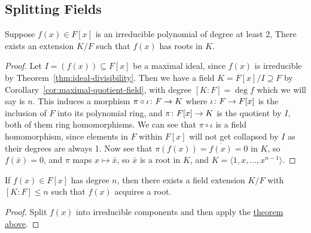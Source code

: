 
\subsection{Splitting Fields}

\begin{theorem}\label{thm:field-extension-gain-root}
    Suppose \(f(x) \in F[x]\) is an irreducible polynomial of degree at least 2,
    There exists an extension \(K/F\) such that \(f(x)\) has roots in \(K\).
\end{theorem}
\begin{proof}
    Let \(I = (f(x)) \subseteq F[x]\) be a maximal ideal,
    since \(f(x)\) is irreducible by Theorem~\ref{thm:ideal-divisibility}.
    Then we have a field \(K = F[x]/I \supseteq F\)
    by Corollary~\ref{cor:maximal-quotient-field},
    with degree \([K:F] = \deg f\) which we will say is \(n\).
    This induces a morphism \(\pi\circ\iota\colon F\to K\)
    where \(\iota\colon F\to F[x]\) is the inclusion of \(F\) into its polynomial ring,
    and \(\pi\colon F[x]\to K\) is the quotient by \(I\),
    both of them ring homomorphisms.
    We can see that \(\pi\circ\iota\) is a field homomorphism,
    since elements in \(F\) within \(F[x]\) will not get collapsed by \(I\)
    as their degrees are always 1.
    Now see that \(\pi(f(x)) = \overline{f(x)} = 0\) in \(K\),
    so \(f(\bar{x}) = 0\), and \(\pi\) maps \(x \mapsto \bar{x}\),
    so \(\bar{x}\) is a root in \(K\),
    and \(K = \langle 1, x, \hdots, x^{n-1} \rangle\).
\end{proof}
\begin{corollary}
    If \(f(x) \in F[x]\) has degree \(n\),
    then there exists a field extension \(K/F\)
    with \([K:F] \leq n\) such that \(f(x)\) acquires a root.
\end{corollary}
\begin{proof}
    Split \(f(x)\) into irreducible components
    and then apply the \hyperref[thm:field-extension-gain-root]{theorem above}.
\end{proof}
